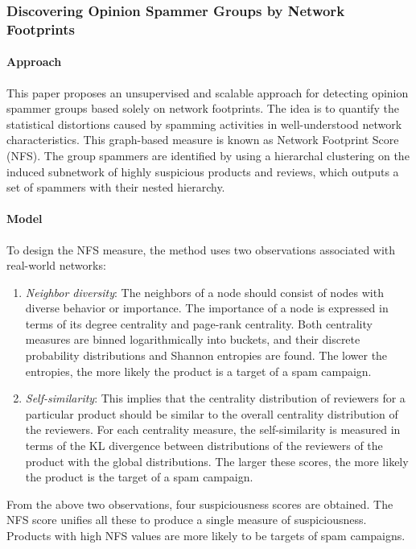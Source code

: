 \documentclass[11pt, oneside]{article}   	%
\begin{document}
\subsubsection{Discovering Opinion Spammer Groups by Network Footprints}

\paragraph{Approach}
\quad

\quad This paper \cite{dosgnf} proposes an unsupervised and scalable approach for detecting opinion spammer groups based solely on network footprints.
The idea is to quantify the statistical distortions caused by spamming activities in well-understood network characteristics.
This graph-based measure is known as Network Footprint Score (NFS).
The group spammers are identified by using a hierarchal clustering on the induced subnetwork of highly suspicious products and reviews, which outputs a set of spammers with their nested hierarchy.

\paragraph{Model}
\quad

To design the NFS measure, the method uses two observations associated with real-world networks:

\begin{enumerate}
\item \emph{Neighbor diversity}: The neighbors of a node should consist of nodes with diverse behavior or importance.
The importance of a node is expressed in terms of its degree centrality and page-rank centrality.
Both centrality measures are binned logarithmically into buckets, and their discrete probability distributions and Shannon entropies are found.
The lower the entropies, the more likely the product is a target of a spam campaign.
\item \emph{Self-similarity}: This implies that the centrality distribution of reviewers for a particular product should be similar to the overall centrality distribution of the reviewers.
For each centrality measure, the self-similarity is measured in terms of the KL divergence between distributions of the reviewers of the product with the global distributions.
The larger these scores, the more likely the product is the target of a spam campaign.
\end{enumerate}

\quad From the above two observations, four suspiciousness scores are obtained.
The NFS score unifies all these to produce a single measure of suspiciousness.
Products with high NFS values are more likely to be targets of spam campaigns.
\end{document}
